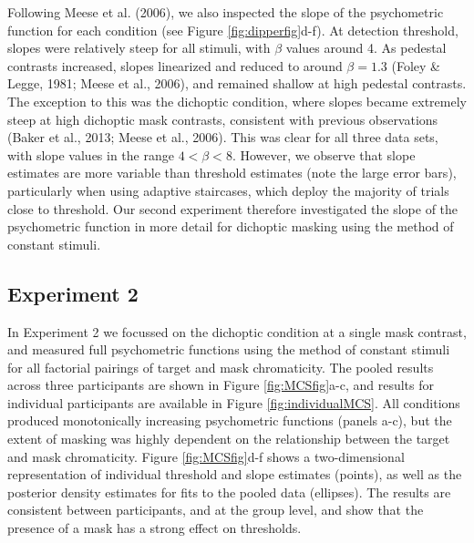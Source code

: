 \documentclass[
]{article}
\begin{document}
Following Meese et al. (2006), we also inspected the slope of the psychometric function for each condition (see Figure \ref{fig:dipperfig}d-f). At detection threshold, slopes were relatively steep for all stimuli, with \(\beta\) values around 4. As pedestal contrasts increased, slopes linearized and reduced to around \(\beta=1.3\) (Foley \& Legge, 1981; Meese et al., 2006), and remained shallow at high pedestal contrasts. The exception to this was the dichoptic condition, where slopes became extremely steep at high dichoptic mask contrasts, consistent with previous observations (Baker et al., 2013; Meese et al., 2006). This was clear for all three data sets, with slope values in the range \(4 < \beta < 8\). However, we observe that slope estimates are more variable than threshold estimates (note the large error bars), particularly when using adaptive staircases, which deploy the majority of trials close to threshold. Our second experiment therefore investigated the slope of the psychometric function in more detail for dichoptic masking using the method of constant stimuli.

\hypertarget{experiment-2}{%
\subsection{Experiment 2}\label{experiment-2}}

In Experiment 2 we focussed on the dichoptic condition at a single mask contrast, and measured full psychometric functions using the method of constant stimuli for all factorial pairings of target and mask chromaticity. The pooled results across three participants are shown in Figure \ref{fig:MCSfig}a-c, and results for individual participants are available in Figure \ref{fig:individualMCS}. All conditions produced monotonically increasing psychometric functions (panels a-c), but the extent of masking was highly dependent on the relationship between the target and mask chromaticity. Figure \ref{fig:MCSfig}d-f shows a two-dimensional representation of individual threshold and slope estimates (points), as well as the posterior density estimates for fits to the pooled data (ellipses). The results are consistent between participants, and at the group level, and show that the presence of a mask has a strong effect on thresholds.
\end{document}

